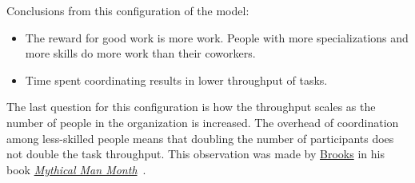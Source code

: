 \begin{samepage}
Conclusions from this configuration of the model:
\begin{itemize}
    \item The reward for good work is more work. People with more specializations and more skills do more work than their coworkers.
    \item Time spent coordinating results in lower throughput of tasks.
\end{itemize}
\end{samepage}

The last question for this configuration is how the throughput scales as the number of people in the organization is increased.
The overhead of coordination among less-skilled people means that doubling the number of participants does not double the task throughput. This observation was made by 
\href{https://en.wikipedia.org/wiki/Fred_Brooks}{Brooks} in his book 
\href{https://en.wikipedia.org/wiki/The_Mythical_Man-Month}{\textit{Mythical Man Month}}~\cite{1975_brooks}. 



